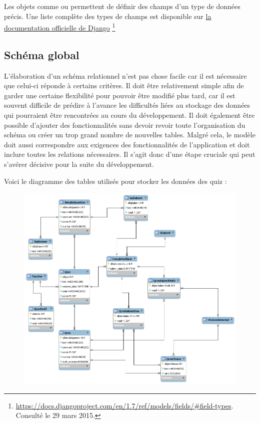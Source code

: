 \documentclass[a4paper,11pt,openany,oneside]{sphinxmanual}
\begin{document}
Les objets comme  ou  permettent de définir des champs d'un type de données précis. Une liste complète des types de champs est disponible sur \href{https://docs.djangoproject.com/en/1.7/ref/models/fields/\#field-types}{la documentation officielle de Django} \footnote{
\href{https://docs.djangoproject.com/en/1.7/ref/models/fields/\#field-types}{https://docs.djangoproject.com/en/1.7/ref/models/fields/\#field-types}. Consulté le 29 mars 2015.
}


\subsection{Schéma global}
\label{database:schema-global}
L'élaboration d'un schéma relationnel n'est pas chose facile car il est nécessaire que celui-ci réponde à certains critères. Il doit être relativement simple afin de garder une certaine flexibilité pour pouvoir être modifié plus tard, car il est souvent difficile de prédire à l'avance les difficultés liées au stockage des données qui pourraient être rencontrées au cours du développement. Il doit également être possible d'ajouter des fonctionnalités sans devoir revoir toute l'organisation du schéma ou créer un trop grand nombre de nouvelles tables. Malgré cela, le modèle doit aussi correspondre aux exigences des fonctionnalités de l'application et doit inclure toutes les relations nécessaires. Il s'agit donc d'une étape cruciale qui peut s'avérer décisive pour la suite du développement.

Voici le diagramme des tables utilisés pour stocker les données des quiz :
\begin{figure}[htbp]
\centering

\includegraphics{quiz-models.png}
\end{figure}
\end{document}
